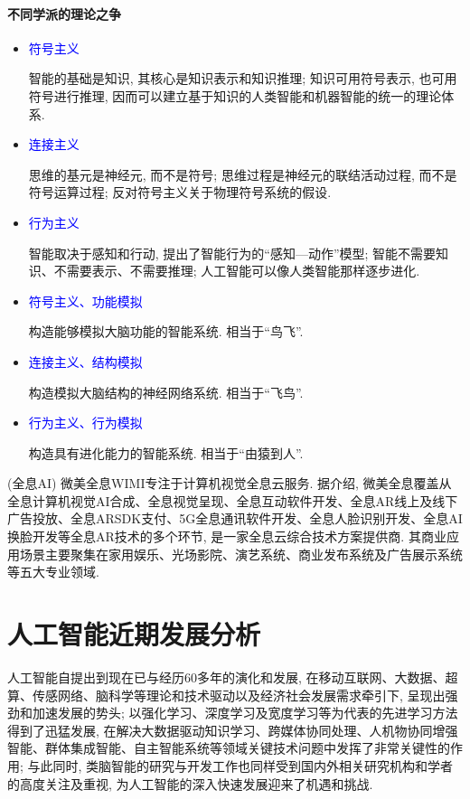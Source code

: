 \paragraph{不同学派的理论之争}
\begin{itemize}
\item \textcolor{blue}{符号主义}

      智能的基础是知识, 其核心是知识表示和知识推理; 知识可用符号表示, 也可用符号进行推理, 因而可以建立基于知识的人类智能和机器智能的统一的理论体系.
\item \textcolor{blue}{连接主义}

      思维的基元是神经元, 而不是符号; 思维过程是神经元的联结活动过程, 而不是符号运算过程; 反对符号主义关于物理符号系统的假设.
\item \textcolor{blue}{行为主义}

      智能取决于感知和行动, 提出了智能行为的“感知—动作”模型; 智能不需要知识、不需要表示、不需要推理; 人工智能可以像人类智能那样逐步进化.

\item \textcolor{blue}{符号主义、功能模拟}

      构造能够模拟大脑功能的智能系统. 相当于“鸟飞”.
\item \textcolor{blue}{连接主义、结构模拟}

      构造模拟大脑结构的神经网络系统. 相当于“飞鸟”.
\item \textcolor{blue}{行为主义、行为模拟}

      构造具有进化能力的智能系统. 相当于“由猿到人”.
\end{itemize}
\begin{example}(全息AI)
微美全息WIMI专注于计算机视觉全息云服务. 据介绍, 微美全息覆盖从全息计算机视觉AI合成、全息视觉呈现、全息互动软件开发、全息AR线上及线下广告投放、全息ARSDK支付、5G全息通讯软件开发、全息人脸识别开发、全息AI换脸开发等全息AR技术的多个环节, 是一家全息云综合技术方案提供商. 其商业应用场景主要聚集在家用娱乐、光场影院、演艺系统、商业发布系统及广告展示系统等五大专业领域.
\end{example}
\section{人工智能近期发展分析}
人工智能自提出到现在已与经历60多年的演化和发展, 在移动互联网、大数据、超算、传感网络、脑科学等理论和技术驱动以及经济社会发展需求牵引下, 呈现出强劲和加速发展的势头;
以强化学习、深度学习及宽度学习等为代表的先进学习方法得到了迅猛发展, 在解决大数据驱动知识学习、跨媒体协同处理、人机物协同增强智能、群体集成智能、自主智能系统等领域关键技术问题中发挥了非常关键性的作用;
与此同时, 类脑智能的研究与开发工作也同样受到国内外相关研究机构和学者的高度关注及重视, 为人工智能的深入快速发展迎来了机遇和挑战.

